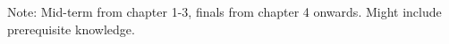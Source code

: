 \documentclass{article}
\begin{document}



\newpage
\tableofcontents

Note: Mid-term from chapter 1-3, finals from chapter 4 onwards. Might include prerequisite knowledge.
\newpage









\end{document}
